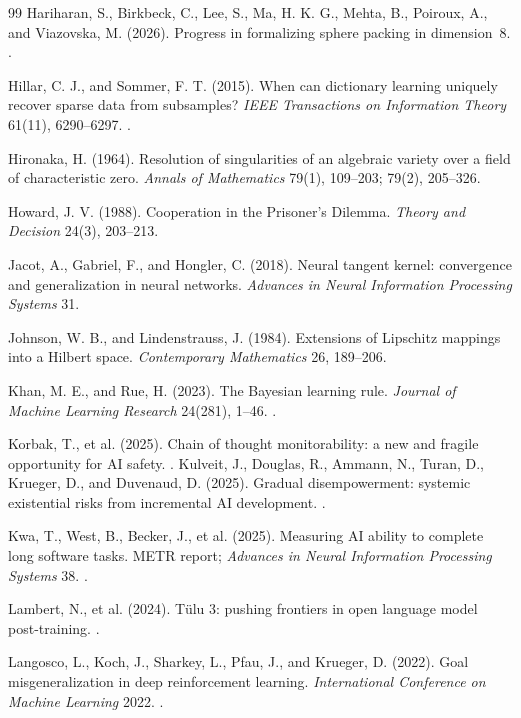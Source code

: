 \begin{thebibliography}{99}
 Hariharan, S., Birkbeck, C., Lee, S., Ma, H. K. G., Mehta, B., Poiroux, A., and Viazovska, M. (2026). Progress in formalizing sphere packing in dimension~8. .

 Hillar, C. J., and Sommer, F. T. (2015). When can dictionary learning uniquely recover sparse data from subsamples? \emph{IEEE Transactions on Information Theory} 61(11), 6290--6297. .

 Hironaka, H. (1964). Resolution of singularities of an algebraic variety over a field of characteristic zero. \emph{Annals of Mathematics} 79(1), 109--203; 79(2), 205--326.

 Howard, J. V. (1988). Cooperation in the Prisoner's Dilemma. \emph{Theory and Decision} 24(3), 203--213.



 Jacot, A., Gabriel, F., and Hongler, C. (2018). Neural tangent kernel: convergence and generalization in neural networks. \emph{Advances in Neural Information Processing Systems} 31.

 Johnson, W. B., and Lindenstrauss, J. (1984). Extensions of Lipschitz mappings into a Hilbert space. \emph{Contemporary Mathematics} 26, 189--206.

 Khan, M. E., and Rue, H. (2023). The Bayesian learning rule. \emph{Journal of Machine Learning Research} 24(281), 1--46. .

 Korbak, T., et al. (2025). Chain of thought monitorability: a new and fragile opportunity for AI safety. .
 Kulveit, J., Douglas, R., Ammann, N., Turan, D., Krueger, D., and Duvenaud, D. (2025). Gradual disempowerment: systemic existential risks from incremental AI development. .






 Kwa, T., West, B., Becker, J., et al. (2025). Measuring AI ability to complete long software tasks. METR report; \emph{Advances in Neural Information Processing Systems} 38. .

 Lambert, N., et al. (2024). T\"ulu 3: pushing frontiers in open language model post-training. .

 Langosco, L., Koch, J., Sharkey, L., Pfau, J., and Krueger, D. (2022). Goal misgeneralization in deep reinforcement learning. \emph{International Conference on Machine Learning} 2022. .


\end{thebibliography}
